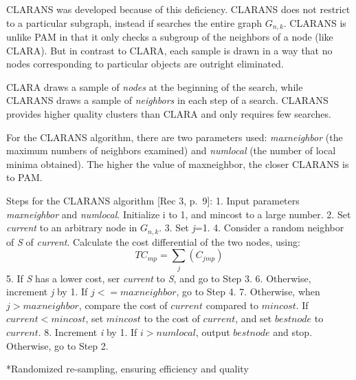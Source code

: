 \documentclass[12pt,twoside]{amherstthesis}
\begin{document}
  CLARANS was developed because of this deficiency. CLARANS does not
  restrict to a particular subgraph, instead if searches the entire graph
  \(G_{n,k}\). CLARANS is unlike PAM in that it only checks a subgroup of
  the neighbors of a node (like CLARA). But in contrast to CLARA, each
  sample is drawn in a way that no nodes corresponding to particular
  objects are outright eliminated.
  
  CLARA draws a sample of \emph{nodes} at the beginning of the search,
  while CLARANS draws a sample of \emph{neighbors} in each step of a
  search. CLARANS provides higher quality clusters than CLARA and only
  requires few searches.
  
  For the CLARANS algorithm, there are two parameters used:
  \emph{maxneighbor} (the maximum numbers of neighbors examined) and
  \emph{numlocal} (the number of local minima obtained). The higher the
  value of maxneighbor, the closer CLARANS is to PAM.
  
  Steps for the CLARANS algorithm {[}Rec 3, p.~9{]}: 1. Input parameters
  \emph{maxneighbor} and \emph{numlocal}. Initialize i to 1, and mincost
  to a large number. 2. Set \emph{current} to an arbitrary node in
  \(G_{n,k}\). 3. Set \emph{j}=1. 4. Consider a random neighbor of
  \emph{S} of \emph{current}. Calculate the cost differential of the two
  nodes, using: \[ TC_{mp} = \sum_j(C_{jmp}) \] 5. If \emph{S} has a lower
  cost, ser \emph{current} to \emph{S}, and go to Step 3. 6. Otherwise,
  increment \emph{j} by 1. If \(j <= maxneighbor\), go to Step 4. 7.
  Otherwise, when \(j > maxneighbor\), compare the cost of \(current\)
  compared to \(mincost\). If \(current < mincost\), set \(mincost\) to
  the cost of \(current\), and set \(bestnode\) to \(current\). 8.
  Increment \emph{i} by 1. If \(i> numlocal\), output \(bestnode\) and
  stop. Otherwise, go to Step 2.
  
  *Randomized re-sampling, ensuring efficiency and quality
  
  \begin{Shaded}
  \begin{Highlighting}[]
  
  \NormalTok{(} \NormalTok{, }
         \NormalTok{, }
         \NormalTok{, } \NormalTok{, } \NormalTok{)}
  \end{Highlighting}
  \end{Shaded}
  
\end{document}
